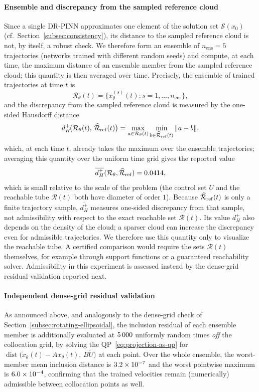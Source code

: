 \documentclass[11pt]{elsarticle}
\theoremstyle{definition}
\theoremstyle{remark}
\numberwithin{equation}{section}
\def\dist{\operatorname{dist}}
\begin{document}
\paragraph{Ensemble and discrepancy from the sampled reference cloud}
Since a single DR-PINN approximates one element of the solution set
$\mathcal{S}(x_0)$ (cf.\ Section~\ref{subsec:consistency}), its distance to
the sampled reference cloud is not, by itself, a robust check. We therefore
form an ensemble of $n_{\mathrm{ens}} = 5$ trajectories (networks trained
with different random seeds) and compute, at each time, the maximum
distance of an ensemble member from the sampled reference cloud; this
quantity is then averaged over time. Precisely, the ensemble of trained
trajectories at time $t$ is
\[
  \mathcal{R}_\theta(t) = \bigl\{x_\theta^{(s)}(t) : s = 1,\dots,n_{\mathrm{ens}}\bigr\},
\]
and the discrepancy from the sampled reference cloud is measured by the
one-sided Hausdorff distance
\[
  d_H^+\!\bigl(\mathcal{R}_\theta(t),\,\widehat{\mathcal{R}}_{\rm ref}(t)\bigr)
  = \max_{a \in \mathcal{R}_\theta(t)}\min_{b \in \widehat{\mathcal{R}}_{\rm ref}(t)}\|a-b\|,
\]
which, at each time $t$, already takes the maximum over the ensemble
trajectories; averaging this quantity over the uniform time grid gives the
reported value
\[
  \overline{d_H^+}(\mathcal{R}_\theta,\widehat{\mathcal{R}}_{\rm ref}) = 0.0414,
\]
which is small relative to the scale of the problem (the control set $U$ and
the reachable tube $\mathcal{R}(t)$ both have diameter of order $1$).
Because $\widehat{\mathcal{R}}_{\rm ref}(t)$ is only a finite trajectory
sample, $\overline{d_H^+}$ measures one-sided discrepancy from that sample,
not admissibility with respect to the exact reachable set $\mathcal{R}(t)$.
Its value $d_H^+$ also depends on the density of the cloud; a sparser cloud
can increase the discrepancy even for admissible trajectories. We therefore use this
quantity only to visualize the reachable tube. A certified comparison
would require the sets $\mathcal{R}(t)$ themselves, for example through
support functions or a guaranteed reachability solver. Admissibility in
this experiment is assessed instead by the dense-grid residual validation
reported next.

\paragraph{Independent dense-grid residual validation}
As announced above, and analogously to the dense-grid check of
Section~\ref{subsec:rotating-ellipsoidal}, the inclusion residual of each
ensemble member is additionally evaluated at $5\,000$ uniformly random
times \emph{off} the collocation grid, by solving the
QP~\eqref{eq:projection-as-qp} for
$\dist\!\bigl(\dot x_\theta(t)-Ax_\theta(t),\,B\widetilde U\bigr)$ at each
point. Over the whole ensemble, the worst-member mean inclusion distance is
$3.2\times 10^{-7}$ and the worst pointwise maximum is
$6.0\times 10^{-4}$, confirming that the trained velocities remain
(numerically) admissible between collocation points as well.
\end{document}
